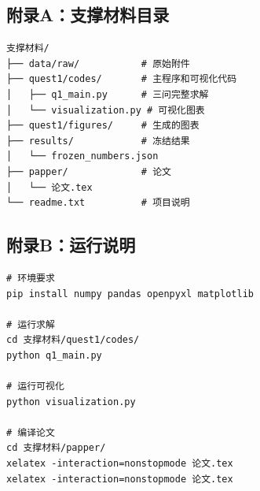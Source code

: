 \documentclass[12pt,a4paper]{article}
\begin{document}
\subsection*{附录A：支撑材料目录}
\begin{verbatim}
支撑材料/
├── data/raw/           # 原始附件
├── quest1/codes/       # 主程序和可视化代码
│   ├── q1_main.py      # 三问完整求解
│   └── visualization.py # 可视化图表
├── quest1/figures/     # 生成的图表
├── results/            # 冻结结果
│   └── frozen_numbers.json
├── papper/             # 论文
│   └── 论文.tex
└── readme.txt          # 项目说明
\end{verbatim}

\subsection*{附录B：运行说明}
\begin{verbatim}
# 环境要求
pip install numpy pandas openpyxl matplotlib

# 运行求解
cd 支撑材料/quest1/codes/
python q1_main.py

# 运行可视化
python visualization.py

# 编译论文
cd 支撑材料/papper/
xelatex -interaction=nonstopmode 论文.tex
xelatex -interaction=nonstopmode 论文.tex
\end{verbatim}
\end{document}
